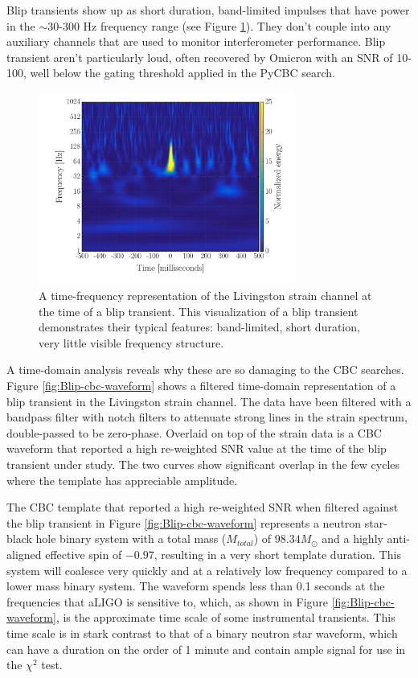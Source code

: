 Blip transients show up as short duration, band-limited impulses that
have power in the $\sim$30-300 Hz frequency range (see Figure \ref{fig:Blip-omega}).
They don't couple
into any auxiliary channels that are used to monitor interferometer performance. Blip
transient aren't particularly loud, often
recovered by Omicron with an SNR of 10-100, well below the gating threshold applied in the
PyCBC search.

\begin{figure}[!ht]%
\centering
  \includegraphics[width=0.75\textwidth]{figures/o1-cbc-dq-paper/Blip-omega-scan}
  \caption[Time-frequency plot blip transient]{A time-frequency representation \cite{ref:omegagrams} of the Livingston strain channel %
           at the time of a blip transient. %
           This visualization of a blip transient demonstrates their typical %
           features: band-limited, short duration, very little visible frequency structure.}
\label{fig:Blip-omega}
\end{figure}

A time-domain analysis reveals
why these are so damaging to the CBC searches. Figure \ref{fig:Blip-cbc-waveform} shows a
filtered time-domain representation of a blip transient in the Livingston strain channel.
The data have been filtered with a bandpass filter
with notch filters to attenuate strong lines in the strain spectrum, double-passed
to be zero-phase. Overlaid on top of the strain data is a CBC waveform that reported a high
re-weighted SNR value at the time of the blip transient under study. The two curves show significant overlap in
the few cycles where the template has appreciable amplitude.

The CBC template that
reported a high re-weighted SNR when filtered against the blip transient in Figure \ref{fig:Blip-cbc-waveform} represents
a neutron star-black hole binary system with a total mass ($M_{total}$) of $98.34 M_{\odot}$ and a
highly anti-aligned effective spin of $-0.97$, resulting in a very short template duration.
This
system will coalesce very quickly and at a relatively low frequency compared to a lower mass
binary system. The waveform
spends less than 0.1 seconds at the frequencies that aLIGO is sensitive to, which,
as shown in Figure \ref{fig:Blip-cbc-waveform}, is the approximate time scale of some
instrumental transients. This time scale is in stark contrast to that of a binary neutron star
waveform, which can have a duration on the order of 1 minute and contain ample signal for use
in the $\chi^{2}$ test.

